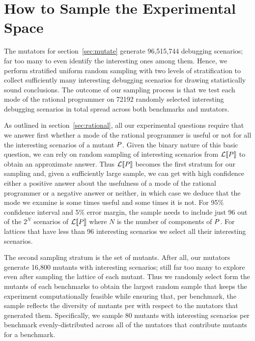 \section{How to Sample the Experimental Space} 

The mutators for section~\ref{sec:mutate} generate 96,515,744 debugging scenarios; 
far too many to even identify the interesting ones among
them. Hence, we perform stratified uniform random sampling with two
levels of stratification to collect sufficiently many interesting
debugging scenarios for drawing statistically sound conclusions. 
The outcome of our sampling process is that we test each mode of the
rational programmer on 72192 randomly selected interesting debugging
scenarios in total spread across both benchmarks and mutators.



As outlined in section~\ref{sec:rational}, all our experimental questions
require that we answer first whether a mode of the rational programmer is
useful or not for all the interesting scenarios of a mutant $P$.
Given the binary nature of this basic question, we can rely on random
sampling of interesting scenarios from $\mathcal{L}\llbracket P\rrbracket$ to obtain an
approximate answer.  Thus $\mathcal{L}\llbracket P\rrbracket$ becomes the first stratum
for our sampling and, given a sufficiently large sample, we can get with
high confidence either a positive answer about the usefulness of a mode of
the rational programmer or a negative answer or neither, in which case we
deduce that the mode we examine is some times useful and some times it is
not. For 95\% confidence interval and 5\% error margin, the sample  needs
to include just 96 out of the $2^N$ scenarios of $\mathcal{L}\llbracket P\rrbracket$
where $N$ is the number of components of $P$. For lattices that have
less than 96 interesting scenarios we select all their interesting
scenarios.

The second sampling stratum is the set of mutants. After all, our mutators
generate 16,800 mutants with interesting scenarios; still far too many to
explore even after sampling the lattice of each mutant. Thus we randomly
select form the mutants of each benchmarks to obtain  the largest random
sample that keeps the experiment computationally feasible  while ensuring
that, per benchmark, the sample reflects the diversity of mutants per with
respect to the mutators that generated them.  Specifically,  we sample 80
mutants with interesting scenarios per benchmark  evenly-distributed
across all of the mutators that contribute mutants for a benchmark.



